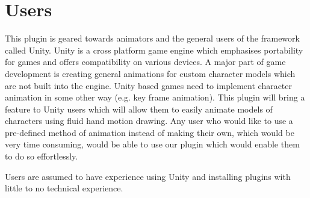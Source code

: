 \section{Users}
This plugin is geared towards animators and the general users of the framework called Unity. Unity is a cross platform game engine which emphasises portability for games and offers compatibility on various devices. A major part of game development is creating general animations for custom character models which are not built into the engine. Unity based games need to implement character animation in some other way (e.g. key frame animation). This plugin will bring a feature to Unity users which will allow them to easily animate models of characters using fluid hand motion drawing. Any user who would like to use a pre-defined method of animation instead of making their own, which would be very time consuming, would be able to use our plugin which would enable them to do so effortlessly.

Users are assumed to have experience using Unity and installing plugins with little to no technical experience.
